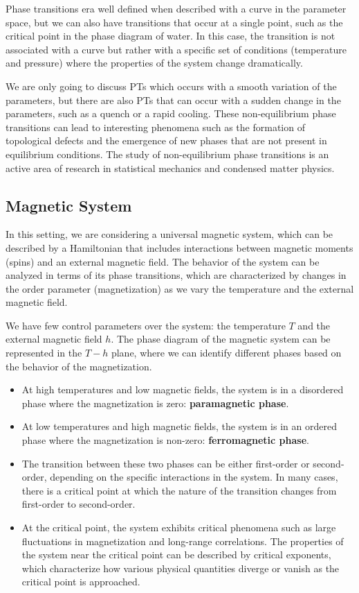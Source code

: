 Phase transitions era well defined when described with a curve in the parameter space, but we can also have transitions that occur at a single point, such as the critical point in the phase diagram of water. In this case, the transition is not associated with a curve but rather with a specific set of conditions (temperature and pressure) where the properties of the system change dramatically.

We are only going to discuss PTs which occurs with a smooth variation of the parameters, but there are also PTs that can occur with a sudden change in the parameters, such as a quench or a rapid cooling. These non-equilibrium phase transitions can lead to interesting phenomena such as the formation of topological defects and the emergence of new phases that are not present in equilibrium conditions. The study of non-equilibrium phase transitions is an active area of research in statistical mechanics and condensed matter physics.

\subsection{Magnetic System}

In this setting, we are considering a universal magnetic system, which can be described by a Hamiltonian that includes interactions between magnetic moments (spins) and an external magnetic field. The behavior of the system can be analyzed in terms of its phase transitions, which are characterized by changes in the order parameter (magnetization) as we vary the temperature and the external magnetic field.

We have few control parameters over the system: the temperature $T$ and the external magnetic field $h$. The phase diagram of the magnetic system can be represented in the $T-h$ plane, where we can identify different phases based on the behavior of the magnetization.
\begin{itemize}
    \item At high temperatures and low magnetic fields, the system is in a disordered phase where the magnetization is zero: \textbf{paramagnetic phase}.
    \item At low temperatures and high magnetic fields, the system is in an ordered phase where the magnetization is non-zero: \textbf{ferromagnetic phase}.
    \item The transition between these two phases can be either first-order or second-order, depending on the specific interactions in the system. In many cases, there is a critical point at which the nature of the transition changes from first-order to second-order.
    \item At the critical point, the system exhibits critical phenomena such as large fluctuations in magnetization and long-range correlations. The properties of the system near the critical point can be described by critical exponents, which characterize how various physical quantities diverge or vanish as the critical point is approached.
\end{itemize}

